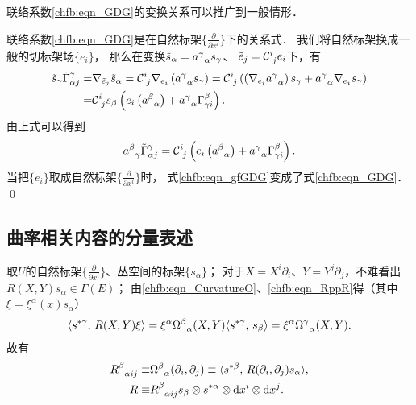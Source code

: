 \begin{example}
	联络系数\eqref{chfb:eqn_GDG}的变换关系可以推广到一般情形．
\end{example}
联络系数\eqref{chfb:eqn_GDG}是在自然标架$\{\frac{\partial }{\partial x^i}\}$下的关系式．
我们将自然标架换成一般的切标架场$\{e_i\}$，
那么在变换$\tilde{s}_\alpha=a_{\hphantom{\alpha}\alpha}^\gamma s_\gamma$、
$\tilde{e}_j=\mathcal{C}_{\hphantom{i}j}^i e_i$下，有
\begin{align*}
	\tilde{s}_\gamma \tilde{\Gamma}^\gamma_{\alpha j}
	=&  \nabla_{\tilde{e}_j} \tilde{s}_\alpha 
	= \mathcal{C}_{\hphantom{i}j}^i \nabla_{e_i} \left(a_{\hphantom{\alpha}\alpha}^\gamma s_\gamma\right)
	= \mathcal{C}_{\hphantom{i}j}^i \left( \left(\nabla_{e_i} a_{\hphantom{\alpha}\alpha}^\gamma\right) s_\gamma
	+ a_{\hphantom{\alpha}\alpha}^\gamma  \nabla_{e_i} s_\gamma\right) \\
	=& \mathcal{C}_{\hphantom{i}j}^i s_\beta \left({e_i}\left( a_{\hphantom{\alpha}\alpha}^\beta\right) 
	+ a_{\hphantom{\alpha}\alpha}^\gamma \Gamma_{\gamma i}^\beta \right) .
\end{align*}
由上式可以得到
\begin{equation}\label{chfb:eqn_gfGDG}
	a_{\hphantom{\alpha}\gamma}^\beta \tilde{\Gamma}^\gamma_{\alpha j} = \mathcal{C}_{\hphantom{i}j}^i 
	\left({e_i}\left( a_{\hphantom{\alpha}\alpha}^\beta\right) 
	+ a_{\hphantom{\alpha}\alpha}^\gamma \Gamma_{\gamma i}^\beta \right) .
\end{equation}
当把$\{e_i\}$取成自然标架$\{\frac{\partial }{\partial x^i}\}$时，
式\eqref{chfb:eqn_gfGDG}变成了式\eqref{chfb:eqn_GDG}．
\qed








\subsection{曲率相关内容的分量表述}

取$U$的自然标架$\{\frac{\partial }{\partial x^i}\}$、丛空间的标架$\{s_\alpha\}$；
对于$X=X^i \partial_i$、$Y=Y^j \partial_j$，不难看出$R(X, Y) s_\alpha \in \Gamma(E)$；
由\eqref{chfb:eqn_CurvatureO}、\eqref{chfb:eqn_RppR}得（其中$\xi = \xi^\alpha(x) s_{\alpha}$）
\begin{align}
	\langle s^{*\gamma},\,  R(X, Y) \xi \rangle
	=\xi^\alpha \Omega_{\hphantom{\alpha}\alpha}^\beta(X, Y) \langle s^{*\gamma},\,  s_{\beta}\rangle 
	=\xi^\alpha \Omega_{\hphantom{\alpha}\alpha}^\gamma (X, Y) .
\end{align}
故有
\begin{subequations}
	\begin{align}
	R_{\hphantom{\alpha}\alpha i j}^\beta \equiv&
	\Omega_{\hphantom{\alpha}\alpha}^\beta (\partial_i, \partial_j) \equiv
	\langle s^{*\beta},\,  R(\partial_i, \partial_j) s_\alpha \rangle ,\\
	R \equiv& R_{\hphantom{\alpha}\alpha i j}^\beta 
	s_\beta \otimes s^{*\alpha}\otimes {\rm d}x^i \otimes {\rm d}x^j .
	\end{align}
\end{subequations}

